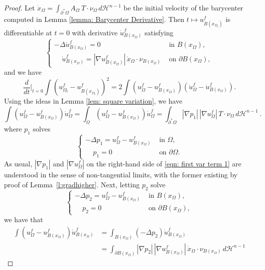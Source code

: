 \documentclass[10pt, reqno]{amsart}
\numberwithin{equation}{section}
\def\W{\Omega}
\def\na{\nabla}
\begin{document}
\begin{proof}
 Let $\dot{x}_\W = \int_{\partial^*\Omega} {A}_{\Omega} \ T \cdot \nu_{\Omega}\, d \mathcal{H}^{n-1}$ be the initial velocity of the barycenter computed in  Lemma \ref{lemma: Barycenter Derivative}. Then $t \mapsto u^f_{B(x_{\W_t})}$ is differentiable at $t=0$ with derivative $\dot u^f_{B(x_\W)}$ satisfying
     \[
     \begin{cases}
      -\Delta \dot{u}^f_{B(x_\W)}=0  &  \text{ in } B(x_\W), \\
     \ \ \ \ \  \dot{u}_{B(x_\W)}^f = |\nabla u_{B(x_\W)}^f|\,  \dot{x}_\W \cdot \nu_{B(x_\W)} & \text{ on }\partial B(x_\W),
     \end{cases}
    \] 
 and we have 
 \[
 \frac{d}{dt}\Bigr|_{t=0} \int \left(u_{\W_t}^f - u_{B(x_{\W_t})}^f \right)^2
 = 2\int \left(u_{\W}^f - u_{B(x_{\W})}^f \right)\left(\dot{u}_{\W}^f - \dot{u}_{B(x_{\W})}^f \right).  
 \]
Using the ideas in Lemma \ref{lem: square variation}, we have 
 \begin{equation}
     \label{eqn: first var term 1}
 \int \left(u_{\W}^f - u_{B(x_{\W})}^f \right)\dot{u}_{\W}^f
 = \int_{\W}\left(u_{\W}^f - u_{B(x_{\W})}^f \right)\dot{u}_{\W}^f
 = \int_{\partial^* \W} |\nabla p_1| \, |\nabla  u_{\W}^f| \, T \cdot \nu_\W \, d\mathcal{H}^{n-1} \,.
 \end{equation}
 where $p_1$ solves 
 \begin{equation}
     \label{eqn: aux PDE}
 \begin{cases}
      -\Delta p_1 = u_{\W}^f - u_{B(x_{\W})}^f & \text{ in } \W, \\
  \ \ \ \ \  p_1 = 0 &  \text{ on } \partial \W. 
 \end{cases}
 \end{equation}
 As usual, $|\nabla p_1|$ and $|\na u_\W^f|$ on the right-hand side of \eqref{eqn: first var term 1} are understood in the sense of non-tangential limits, with the former existing by proof of Lemma~\ref{l:gradhigher}.
 Next, letting $p_2$ solve 
 \[
 \begin{cases}
     -\Delta p_2 = u_{\W}^f - u_{B(x_{\W})}^f &  \text{ in } B({x_{\W}}), \\
  \ \ \ \ \  p_2 = 0 &  \text{ on } \partial B(x_{\W}), 
 \end{cases}
 \]
 we have that 
 \[
 \begin{aligned}
 \int \left(u_{\W}^f - u_{B(x_{\W})}^f \right)\dot{u}_{B(x_{\W})}^f 
 &= \int_{B(x_{\W})} \left(-\Delta p_2 \right)\dot{u}_{B(x_{\W})}^f \\
 &= \int_{\partial B(x_{\W})} |\nabla p_2| \, | \nabla u_{B(x_{\W})}^f| \, \dot{x}_\W \cdot \nu_{B(x_\W)} \, d\mathcal{H}^{n-1}

\end{aligned}\]
\end{proof}
\end{document}
